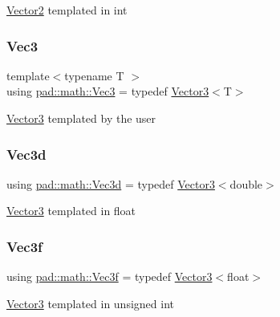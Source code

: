 \mbox{\hyperlink{structpad_1_1math_1_1_vector2}{Vector2}} templated in int \mbox{\label{namespacepad_1_1math_ad878ee274f48f47da283bb61ecef9f3d}} 
\subsubsection{\texorpdfstring{Vec3}{Vec3}}
{\footnotesize\ttfamily template$<$typename T $>$ \\
using \mbox{\hyperlink{namespacepad_1_1math_ad878ee274f48f47da283bb61ecef9f3d}{pad\+::math\+::\+Vec3}} = typedef \mbox{\hyperlink{structpad_1_1math_1_1_vector3}{Vector3}}$<$T$>$}

\mbox{\hyperlink{structpad_1_1math_1_1_vector3}{Vector3}} templated by the user \mbox{\label{namespacepad_1_1math_ac1dd5a09fe437a7bd40f196b509932f2}} 
\subsubsection{\texorpdfstring{Vec3d}{Vec3d}}
{\footnotesize\ttfamily using \mbox{\hyperlink{namespacepad_1_1math_ac1dd5a09fe437a7bd40f196b509932f2}{pad\+::math\+::\+Vec3d}} = typedef \mbox{\hyperlink{structpad_1_1math_1_1_vector3}{Vector3}}$<$double$>$}

\mbox{\hyperlink{structpad_1_1math_1_1_vector3}{Vector3}} templated in float \mbox{\label{namespacepad_1_1math_ac2c67cf958d2b7d769b35022eb197757}} 
\subsubsection{\texorpdfstring{Vec3f}{Vec3f}}
{\footnotesize\ttfamily using \mbox{\hyperlink{namespacepad_1_1math_ac2c67cf958d2b7d769b35022eb197757}{pad\+::math\+::\+Vec3f}} = typedef \mbox{\hyperlink{structpad_1_1math_1_1_vector3}{Vector3}}$<$float$>$}

\mbox{\hyperlink{structpad_1_1math_1_1_vector3}{Vector3}} templated in unsigned int \mbox{\label{namespacepad_1_1math_acccfc4afcdb1f72c6881e0e74078eb7b}} 
